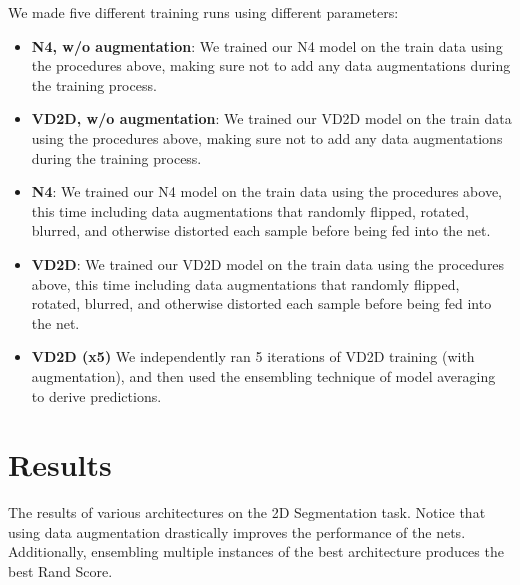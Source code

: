 We made five different training runs using different parameters:

\begin{itemize}
	\item \textbf{N4, w/o augmentation}: We trained our N4 model on the train data using the procedures above, making sure not to add any data augmentations during the training process.
	\item \textbf{VD2D, w/o augmentation}: We trained our VD2D model on the train data using the procedures above, making sure not to add any data augmentations during the training process.
	\item \textbf{N4}: We trained our N4 model on the train data using the procedures above, this time including data augmentations that randomly flipped, rotated, blurred, and otherwise distorted each sample before being fed into the net.
	\item \textbf{VD2D}: We trained our VD2D model on the train data using the procedures above, this time including data augmentations that randomly flipped, rotated, blurred, and otherwise distorted each sample before being fed into the net.
	\item \textbf{VD2D (x5)} We independently ran 5 iterations of VD2D training (with augmentation), and then used the ensembling technique of model averaging to derive predictions.
\end{itemize}

\section{Results}

\begin{table}
\centering
	
	\caption[Results of 2D Segmentation]{The results of various architectures on the 2D Segmentation task. Notice that using data augmentation drastically improves the performance of the nets. Additionally, ensembling multiple instances of the best architecture produces the best Rand Score.}
	\label{tab:2d_results}
\end{table}

